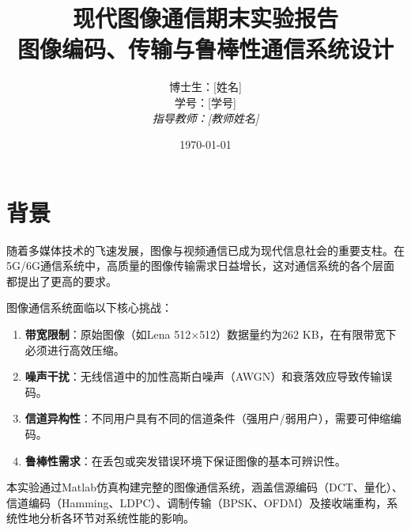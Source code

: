 \documentclass[12pt, a4paper]{article}
\title{
    \vspace{2cm}
    \textbf{现代图像通信期末实验报告} \\
    \large 图像编码、传输与鲁棒性通信系统设计
}
\author{
    博士生：[姓名] \\
    学号：[学号] \\
    \textit{指导教师：[教师姓名]}
}
\date{\today}
\begin{document}
\maketitle
\thispagestyle{empty}
\newpage

\tableofcontents
\newpage

\section{背景}

随着多媒体技术的飞速发展，图像与视频通信已成为现代信息社会的重要支柱。在5G/6G通信系统中，高质量的图像传输需求日益增长，这对通信系统的各个层面都提出了更高的要求。

图像通信系统面临以下核心挑战：
\begin{enumerate}
    \item \textbf{带宽限制}：原始图像（如Lena 512$\times$512）数据量约为262 KB，在有限带宽下必须进行高效压缩。
    \item \textbf{噪声干扰}：无线信道中的加性高斯白噪声（AWGN）和衰落效应导致传输误码。
    \item \textbf{信道异构性}：不同用户具有不同的信道条件（强用户/弱用户），需要可伸缩编码。
    \item \textbf{鲁棒性需求}：在丢包或突发错误环境下保证图像的基本可辨识性。
\end{enumerate}

本实验通过Matlab仿真构建完整的图像通信系统，涵盖信源编码（DCT、量化）、信道编码（Hamming、LDPC）、调制传输（BPSK、OFDM）及接收端重构，系统性地分析各环节对系统性能的影响。
\end{document}
